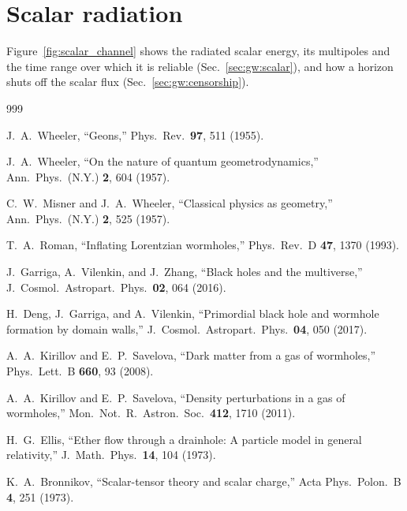\documentclass[twocolumn,floatfix,aps,prd,superscriptaddress,nofootinbib]{revtex4-2}
\begin{document}
\section{Scalar radiation}
\label{app:supp}

Figure~\ref{fig:scalar_channel} shows the radiated scalar energy, its multipoles and the time range over which it is reliable (Sec.~\ref{sec:gw:scalar}), and how a horizon shuts off the scalar flux (Sec.~\ref{sec:gw:censorship}).

\FloatBarrier

\begin{thebibliography}{999}

J.~A.~Wheeler,
\newblock ``Geons,''
\newblock Phys.\ Rev.\ \textbf{97}, 511 (1955).

J.~A.~Wheeler,
\newblock ``On the nature of quantum geometrodynamics,''
\newblock Ann.\ Phys.\ (N.Y.) \textbf{2}, 604 (1957).

C.~W.~Misner and J.~A.~Wheeler,
\newblock ``Classical physics as geometry,''
\newblock Ann.\ Phys.\ (N.Y.) \textbf{2}, 525 (1957).

T.~A.~Roman,
\newblock ``Inflating Lorentzian wormholes,''
\newblock Phys.\ Rev.\ D \textbf{47}, 1370 (1993).

J.~Garriga, A.~Vilenkin, and J.~Zhang,
\newblock ``Black holes and the multiverse,''
\newblock J.\ Cosmol.\ Astropart.\ Phys.\ \textbf{02}, 064 (2016).

H.~Deng, J.~Garriga, and A.~Vilenkin,
\newblock ``Primordial black hole and wormhole formation by domain walls,''
\newblock J.\ Cosmol.\ Astropart.\ Phys.\ \textbf{04}, 050 (2017).

A.~A.~Kirillov and E.~P.~Savelova,
\newblock ``Dark matter from a gas of wormholes,''
\newblock Phys.\ Lett.\ B \textbf{660}, 93 (2008).

A.~A.~Kirillov and E.~P.~Savelova,
\newblock ``Density perturbations in a gas of wormholes,''
\newblock Mon.\ Not.\ R.\ Astron.\ Soc.\ \textbf{412}, 1710 (2011).

H.~G.~Ellis,
\newblock ``Ether flow through a drainhole: A particle model in general relativity,''
\newblock J.\ Math.\ Phys.\ \textbf{14}, 104 (1973).

K.~A.~Bronnikov,
\newblock ``Scalar-tensor theory and scalar charge,''
\newblock Acta Phys.\ Polon.\ B \textbf{4}, 251 (1973).


\end{thebibliography}
\end{document}
